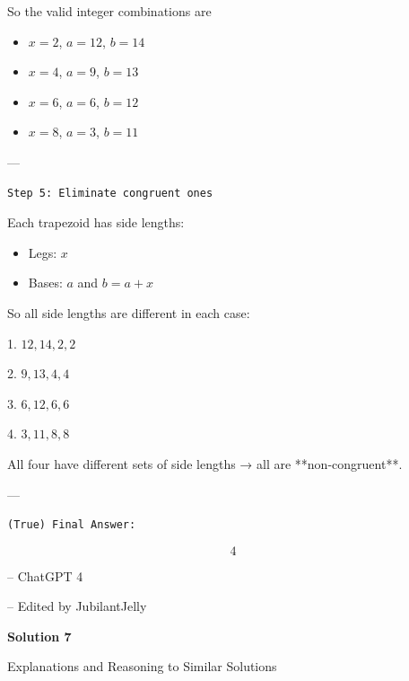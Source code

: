 \begin{enumerate}
 So the valid integer combinations are

 
            \begin{itemize}
        \item $x = 2$, $a = 12$, $b = 14$
        \item $x = 4$, $a = 9$, $b = 13$
        \item $x = 6$, $a = 6$, $b = 12$
        \item $x = 8$, $a = 3$, $b = 11$
            \end{itemize}
            ---

 \begin{verbatim}
Step 5: Eliminate congruent ones
\end{verbatim}

Each trapezoid has side lengths:

 
            \begin{itemize}
        \item Legs: $x$
        \item Bases: $a$ and $b = a + x$
            \end{itemize}
            So all side lengths are different in each case:

 1. $12, 14, 2, 2$

 2. $9, 13, 4, 4$

 3. $6, 12, 6, 6$

 4. $3, 11, 8, 8$

 All four have different sets of side lengths → all are **non-congruent**.

 ---

 \begin{verbatim}
(True) Final Answer:
\end{verbatim}


 \[\boxed{4}\]

 -- ChatGPT 4

 -- Edited by JubilantJelly

 



\textbf{Solution 7}

Explanations and Reasoning to Similar Solutions


\end{enumerate}

